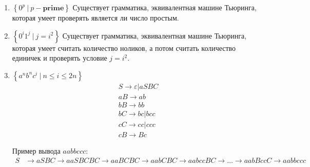 \documentclass[fleqn]{article}
\begin{document}
\begin{enumerate}
\begin{enumerate}
	\item $\left\{ 0^p         \ | \ p - \mathbf{prime} \right\}$
	Существует грамматика, эквивалентная машине Тьюринга, которая умеет проверять является ли число простым.
	
	\item $\left\{ 0^i 1^j     \ | \ j = i^2 \right\}$
	Существует грамматика, эквивалентная машине Тьюринга, которая умеет считать количество ноликов, а потом 
	считать количество единичек и проверять условие $j = i^2$.
	
	\item $\left\{ a^n b^n c^i \ | \ n \leq i \leq 2n \right\}$
	\begin{align*}
		& S \to \varepsilon | aSBC \\
		& aB \to ab \\
		& bB \to bb \\
		& bC \to bc|bcc \\
		& cC \to cc | ccc \\
		& cB \to Bc
	\end{align*}
	
	Пример вывода $aabbccc$:
	\begin{align*}
	S &\to aSBC \to aaSBCBC \to aaBCBC \to aabCBC \to aabccBC \to \dots \to aabBccC \to aabbccc
	\end{align*}
\end{enumerate}

\end{enumerate}
\end{document}
